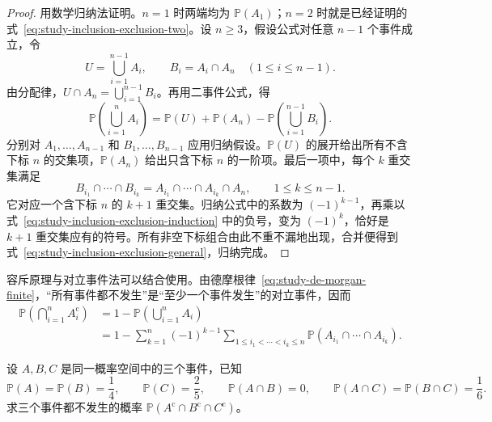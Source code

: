 \documentclass[UTF8,12pt,a4paper,fontset=fandol]{ctexbook}
\begin{document}
\begin{proof}
用数学归纳法证明。$n=1$ 时两端均为 $\mathbb P(A_1)$；$n=2$ 时就是已经证明的式~\eqref{eq:study-inclusion-exclusion-two}。设 $n\ge3$，假设公式对任意 $n-1$ 个事件成立，令
\[
  U=\bigcup_{i=1}^{n-1}A_i,\qquad B_i=A_i\cap A_n\quad(1\le i\le n-1).
\]
由分配律，$U\cap A_n=\bigcup_{i=1}^{n-1}B_i$。再用二事件公式，得
\begin{equation}
  \mathbb P\!\left(\bigcup_{i=1}^{n}A_i\right)
    =\mathbb P(U)+\mathbb P(A_n)
      -\mathbb P\!\left(\bigcup_{i=1}^{n-1}B_i\right).
  \label{eq:study-inclusion-exclusion-induction}
\end{equation}
分别对 $A_1,\ldots,A_{n-1}$ 和 $B_1,\ldots,B_{n-1}$ 应用归纳假设。$\mathbb P(U)$ 的展开给出所有不含下标 $n$ 的交集项，$\mathbb P(A_n)$ 给出只含下标 $n$ 的一阶项。最后一项中，每个 $k$ 重交集满足
\[
  B_{i_1}\cap\cdots\cap B_{i_k}
    =A_{i_1}\cap\cdots\cap A_{i_k}\cap A_n,
  \qquad 1\le k\le n-1.
\]
它对应一个含下标 $n$ 的 $k+1$ 重交集。归纳公式中的系数为 $(-1)^{k-1}$，再乘以式~\eqref{eq:study-inclusion-exclusion-induction} 中的负号，变为 $(-1)^k$，恰好是 $k+1$ 重交集应有的符号。所有非空下标组合由此不重不漏地出现，合并便得到式~\eqref{eq:study-inclusion-exclusion-general}，归纳完成。
\end{proof}

容斥原理与对立事件法可以结合使用。由德摩根律~\eqref{eq:study-de-morgan-finite}，“所有事件都不发生”是“至少一个事件发生”的对立事件，因而
\begin{equation}
  \begin{aligned}
    \mathbb P\!\left(\bigcap_{i=1}^{n}A_i^{\mathrm c}\right)
      &=1-\mathbb P\!\left(\bigcup_{i=1}^{n}A_i\right)\\
      &=1-\sum_{k=1}^{n}(-1)^{k-1}
        \sum_{1\le i_1<\cdots<i_k\le n}
        \mathbb P(A_{i_1}\cap\cdots\cap A_{i_k}).
  \end{aligned}
  \label{eq:study-inclusion-exclusion-complement}
\end{equation}

\begin{example}
\label{ex:study-inclusion-exclusion-complement}
设 $A,B,C$ 是同一概率空间中的三个事件，已知
\[
  \mathbb P(A)=\mathbb P(B)=\frac14,\qquad \mathbb P(C)=\frac25,
  \qquad \mathbb P(A\cap B)=0,\qquad
  \mathbb P(A\cap C)=\mathbb P(B\cap C)=\frac16.
\]
求三个事件都不发生的概率 $\mathbb P(A^{\mathrm c}\cap B^{\mathrm c}\cap C^{\mathrm c})$。
\end{example}
\end{document}
